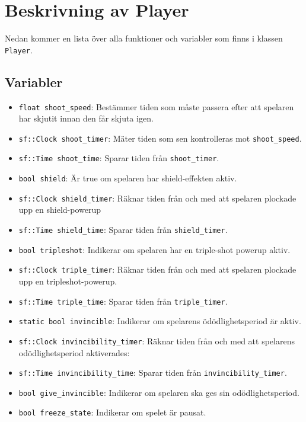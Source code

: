 \documentclass{TDP003mall}
\begin{document}
\section{Beskrivning av Player}
Nedan kommer en lista över alla funktioner och variabler som finns i klassen \texttt{Player}.
\subsection{Variabler}
\begin{itemize}
\item \texttt{float shoot\_speed}: Bestämmer tiden som måste passera efter att spelaren har skjutit innan den får skjuta igen.
\item \texttt{sf::Clock shoot\_timer}: Mäter tiden som sen kontrolleras mot \texttt{shoot\_speed}.
\item \texttt{sf::Time shoot\_time}: Sparar tiden från \texttt{shoot\_timer}.
\item \texttt{bool shield}: Är true om spelaren har shield-effekten aktiv.
\item \texttt{sf::Clock shield\_timer}: Räknar tiden från och med att spelaren plockade upp en shield-powerup
\item \texttt{sf::Time shield\_time}: Sparar tiden från \texttt{shield\_timer}.
\item \texttt{bool tripleshot}: Indikerar om spelaren har en triple-shot powerup aktiv.
\item \texttt{sf::Clock triple\_timer}: Räknar tiden från och med att spelaren plockade upp en tripleshot-powerup.
\item \texttt{sf::Time triple\_time}: Sparar tiden från \texttt{triple\_timer}.
\item \texttt{static bool invincible}: Indikerar om spelarens ödödlighetsperiod är aktiv.
\item \texttt{sf::Clock invincibility\_timer}: Räknar tiden från och med att spelarens odödlighetsperiod aktiverades:
\item \texttt{sf::Time invincibility\_time}: Sparar tiden från \texttt{invincibility\_timer}.
\item \texttt{bool give\_invincible}: Indikerar om spelaren ska ges sin odödlighetsperiod.
\item \texttt{bool freeze\_state}: Indikerar om spelet är pausat.
\end{itemize}
\end{document}
